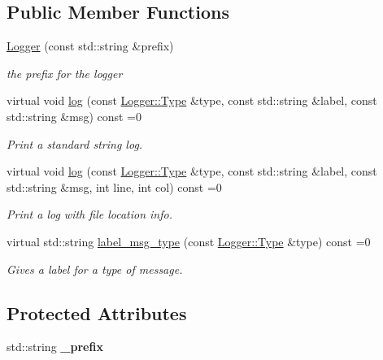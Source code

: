 \subsection*{Public Member Functions}
\begin{DoxyCompactItemize}
\item 
\mbox{\hyperlink{class_logger_a5eb8bf6f6a9111e62a7b2fee03ef7541}{Logger}} (const std\+::string \&prefix)
\begin{DoxyCompactList}\small\item\em the prefix for the logger \end{DoxyCompactList}\item 
virtual void \mbox{\hyperlink{class_logger_a124934c1b2661b229aca0493f7ec5f30}{log}} (const \mbox{\hyperlink{class_logger_acd39cb578d7a6750c959f2fad38d8db6}{Logger\+::\+Type}} \&type, const std\+::string \&label, const std\+::string \&msg) const =0
\begin{DoxyCompactList}\small\item\em Print a standard string log. \end{DoxyCompactList}\item 
virtual void \mbox{\hyperlink{class_logger_a9bdd18a8fb9cd19134b9ddf37f74b5bd}{log}} (const \mbox{\hyperlink{class_logger_acd39cb578d7a6750c959f2fad38d8db6}{Logger\+::\+Type}} \&type, const std\+::string \&label, const std\+::string \&msg, int line, int col) const =0
\begin{DoxyCompactList}\small\item\em Print a log with file location info. \end{DoxyCompactList}\item 
virtual std\+::string \mbox{\hyperlink{class_logger_abe4434e4ae0efd8b41cb2a61458a710d}{label\+\_\+msg\+\_\+type}} (const \mbox{\hyperlink{class_logger_acd39cb578d7a6750c959f2fad38d8db6}{Logger\+::\+Type}} \&type) const =0
\begin{DoxyCompactList}\small\item\em Gives a label for a type of message. \end{DoxyCompactList}\end{DoxyCompactItemize}
\subsection*{Protected Attributes}
\begin{DoxyCompactItemize}
\item 
\mbox{\label{class_logger_a0ae9b0eba99d9b371b921558a1f92942}} 
std\+::string {\bfseries \+\_\+prefix}
\end{DoxyCompactItemize}


